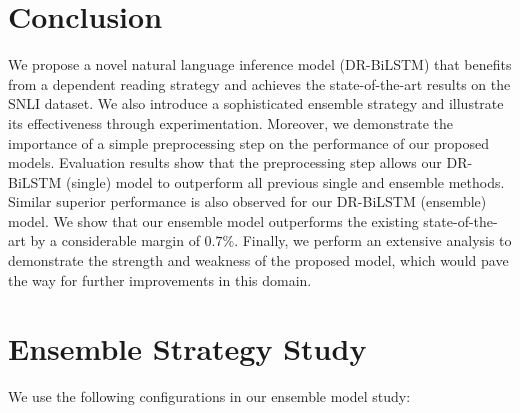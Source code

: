 \documentclass[11pt,a4paper]{article}
\begin{document}
	\section{Conclusion}
	We propose a novel natural language inference model (DR-BiLSTM) that benefits from a dependent reading strategy and achieves the state-of-the-art results on the SNLI dataset. We also introduce a sophisticated ensemble strategy and illustrate its effectiveness through experimentation. Moreover, we demonstrate the importance of a simple preprocessing step on the performance of our proposed models. Evaluation results show that the preprocessing step allows our DR-BiLSTM (single) model to outperform all previous single and ensemble methods. Similar superior performance is also observed for our DR-BiLSTM (ensemble) model. We show that our ensemble model outperforms the existing state-of-the-art by a considerable margin of $0.7\%$. Finally, we perform an extensive analysis to demonstrate the strength and weakness of the proposed model, which would pave the way for further improvements in this domain.

	
	
	
	\appendix
	
	\section{Ensemble Strategy Study} 
	\label{app:ensemble:sec}
	We use the following configurations in our ensemble model study:
	
\end{document}
